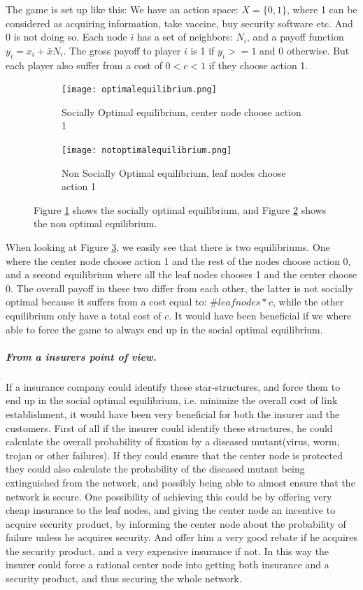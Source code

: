 The game is set up like this:
We have an action space: $X=\{0,1\}$, where 1 can be considered as acquiring information, take vaccine, buy security software etc. And 0 is not doing so.
Each node $i$ has a set of neighbors: $N_{i} $, and a payoff function $y_{i}=x_{i}+\bar{x}N_{i}$. 
The gross payoff to player $i$ is 1 if $y_{i}>=1$ and 0 otherwise. But each player also suffer from a cost of $0<c<1$ if they choose action 1.
\begin{figure}[h]
\centering
\begin{subfigure}{.4\textwidth}
  \centering
  \texttt{[image: optimalequilibrium.png]}
  \caption{\label{fig:optequi} Socially Optimal equilibrium, center node choose action 1}
\end{subfigure}
\quad
\begin{subfigure}{.4\textwidth}
  \centering
  \texttt{[image: notoptimalequilibrium.png]}
  \caption{\label{fig:notoptequi} Non Socially Optimal equilibrium, leaf nodes choose action 1}
\end{subfigure}
\caption{\label{fig:starequi} Figure \ref{fig:optequi} shows the socially optimal equilibrium, and Figure \ref{fig:notoptequi} shows the non optimal equilibrium.}

\end{figure}
When looking at Figure \ref{fig:starequi}, we easily see that there is two equilibriums. One where the center node choose action 1 and the rest of the nodes choose action 0, and a second equilibrium where all the leaf nodes chooses 1 and the center choose 0.
The overall payoff in these two differ from each other, the latter is not socially optimal because it
 suffers from a cost equal to: $\#leaf nodes*c$, while the other equilibrium only have a total cost of $c$.
 It would have been beneficial if we where able to force the game to always end up in the social optimal equilibrium.


\subparagraph{From a insurers point of view.}
If a insurance company could identify these star-structures, and force them to end up in the social optimal equilibrium, i.e. minimize the overall cost of link establishment, it would have been very beneficial for both the insurer and the customers.
First of all if the insurer could identify these structures, he could calculate the overall probability of fixation by a diseased mutant(virus, worm, trojan or other failures). If they could ensure that the center node is protected they could also calculate the probability of the diseased mutant being extinguished from the network, and possibly being able to almost ensure that the network is secure. 
One possibility of achieving this could be by offering very cheap insurance to the leaf nodes, and giving the center node an incentive to acquire security product, by informing the center node about the probability of failure unless he acquires security. And offer him a very good rebate if he acquires the security product, and a very expensive insurance if not. In this way the insurer could force a rational center node into getting both insurance and a security product, and thus securing the whole network.

